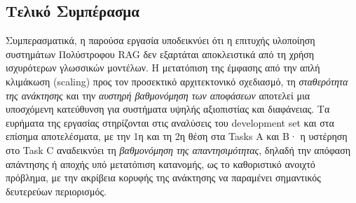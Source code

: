 \subsection{Τελικό Συμπέρασμα}

Συμπερασματικά, η παρούσα εργασία υποδεικνύει ότι η επιτυχής υλοποίηση συστημάτων Πολύστροφου RAG δεν εξαρτάται αποκλειστικά από τη χρήση ισχυρότερων γλωσσικών μοντέλων. Η μετατόπιση της έμφασης από την απλή κλιμάκωση (scaling) προς τον προσεκτικό αρχιτεκτονικό σχεδιασμό, τη \textit{σταθερότητα της ανάκτησης} και την \textit{αυστηρή βαθμονόμηση των αποφάσεων} αποτελεί μια υποσχόμενη κατεύθυνση για συστήματα υψηλής αξιοπιστίας και διαφάνειας. Τα ευρήματα της εργασίας στηρίζονται στις αναλύσεις του development set και στα επίσημα αποτελέσματα, με την 1η και τη 2η θέση στα Tasks A και B· η υστέρηση στο Task C αναδεικνύει τη \textit{βαθμονόμηση της απαντησιμότητας}, δηλαδή την απόφαση απάντησης ή αποχής υπό μετατόπιση κατανομής, ως το καθοριστικό ανοιχτό πρόβλημα, με την ακρίβεια κορυφής της ανάκτησης να παραμένει σημαντικός δευτερεύων περιορισμός.
